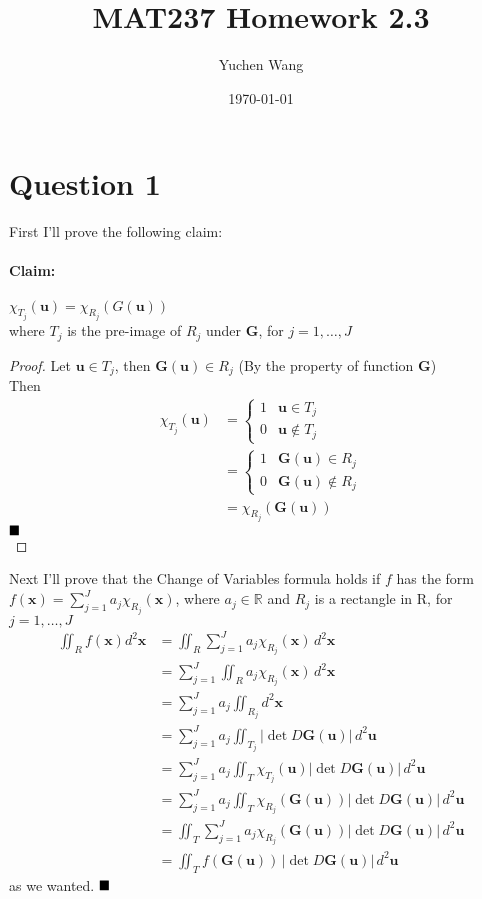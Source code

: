 \documentclass[11pt]{article}
\title{MAT237 Homework 2.3}
\author{Yuchen Wang}
\date{\today}
\newcommand{\tb}[1]{\textbf{#1}}
\newcommand{\real}[0]{\mathbb{R}}
\newcommand{\vx}[0]{\tb{x}}
\newcommand{\vu}[0]{\tb{u}}
\newcommand{\qed}[0]{$\hfill\blacksquare$}
\begin{document}
    \maketitle
    \newpage


\section*{Question 1}
First I'll prove the following claim:
\paragraph{Claim:} $\chi_{T_j}(\vu) = \chi_{R_j}(G(\vu))$ \\where $T_j$ is the pre-image of $R_j$ under \tb{G}, for $j = 1, \hdots, J$\\
\begin{proof}
	Let $\vu \in T_j$, then $\tb{G}(\vu) \in R_j$ (By the property of function \tb{G}) \\
	Then
\begin{align*}
	\chi_{T_j}(\vu) &= 
	\begin{cases} 
      1 & \vu \in T_j \\
      0 & \vu \notin T_j
   \end{cases} \\
   &= 
   	\begin{cases} 
      1 & \tb{G}(\vu) \in R_j \\
      0 & \tb{G}(\vu) \notin R_j
   \end{cases} \\
   &= \chi_{R_j}(\tb{G}(\vu))
\end{align*} \qed \\
\end{proof}
Next I'll prove that the Change of Variables formula holds if $f$ has the form
$f(\vx) = \sum_{j=1}^J a_j\chi_{R_j}(\vx)$, where $a_j \in \real$ and $R_j$ is a rectangle in R, for $j = 1, \hdots, J$\\
\begin{align*}
	\iint_R f(\vx)d^2\vx &= \iint_R \sum_{j=1}^J a_j\chi_{R_j}(\vx)\,d^2\vx \\
	&= \sum_{j=1}^J \iint_R a_j\chi_{R_j}(\vx)\,d^2\vx \\
	&= \sum_{j=1}^J a_j \iint_{R_j} d^2\vx \\
	&= \sum_{j=1}^J a_j \iint_{T_j} |\det D\tb{G}(\vu)|\,d^2\vu \tag{By assumption (2)} \\
	&= \sum_{j=1}^J a_j \iint_{T} \chi_{T_j}(\vu)|\det D\tb{G}(\vu)|\,d^2\vu \\
	&= \sum_{j=1}^J a_j \iint_{T} \chi_{R_j}(\tb{G}(\vu))|\det D\tb{G}(\vu)|\,d^2\vu  \tag{by Claim} \\ 
	&= \iint_{T} \sum_{j=1}^J a_j \chi_{R_j}(\tb{G}(\vu))|\det D\tb{G}(\vu)|\,d^2\vu \\
	&= \iint_T f(\tb{G}(\vu)) \,|\det D\tb{G}(\vu)| \, d^2\vu
\end{align*}
as we wanted. \qed
\newpage
\end{document}
